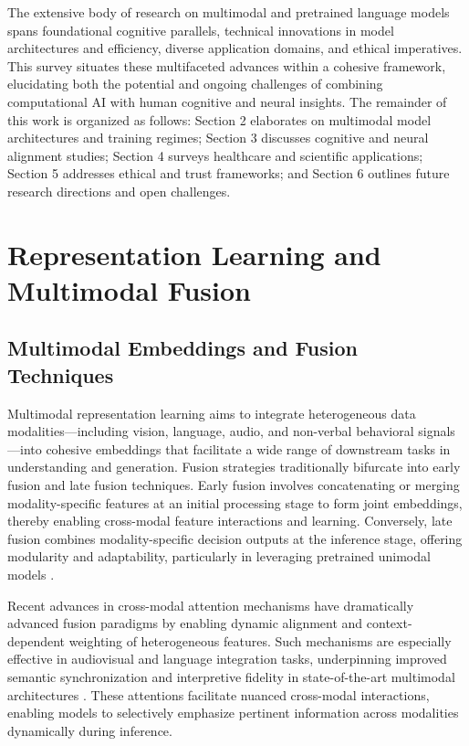 \documentclass[sigconf]{acmart}
\begin{document}
The extensive body of research on multimodal and pretrained language models spans foundational cognitive parallels, technical innovations in model architectures and efficiency, diverse application domains, and ethical imperatives. This survey situates these multifaceted advances within a cohesive framework, elucidating both the potential and ongoing challenges of combining computational AI with human cognitive and neural insights. The remainder of this work is organized as follows: Section 2 elaborates on multimodal model architectures and training regimes; Section 3 discusses cognitive and neural alignment studies; Section 4 surveys healthcare and scientific applications; Section 5 addresses ethical and trust frameworks; and Section 6 outlines future research directions and open challenges.

\section{Representation Learning and Multimodal Fusion}

\subsection{Multimodal Embeddings and Fusion Techniques}

Multimodal representation learning aims to integrate heterogeneous data modalities---including vision, language, audio, and non-verbal behavioral signals---into cohesive embeddings that facilitate a wide range of downstream tasks in understanding and generation. Fusion strategies traditionally bifurcate into early fusion and late fusion techniques. Early fusion involves concatenating or merging modality-specific features at an initial processing stage to form joint embeddings, thereby enabling cross-modal feature interactions and learning. Conversely, late fusion combines modality-specific decision outputs at the inference stage, offering modularity and adaptability, particularly in leveraging pretrained unimodal models \cite{ref1,ref2}. 

Recent advances in cross-modal attention mechanisms have dramatically advanced fusion paradigms by enabling dynamic alignment and context-dependent weighting of heterogeneous features. Such mechanisms are especially effective in audiovisual and language integration tasks, underpinning improved semantic synchronization and interpretive fidelity in state-of-the-art multimodal architectures \cite{ref3,ref4,ref5,ref12,ref32}. These attentions facilitate nuanced cross-modal interactions, enabling models to selectively emphasize pertinent information across modalities dynamically during inference.
\end{document}
